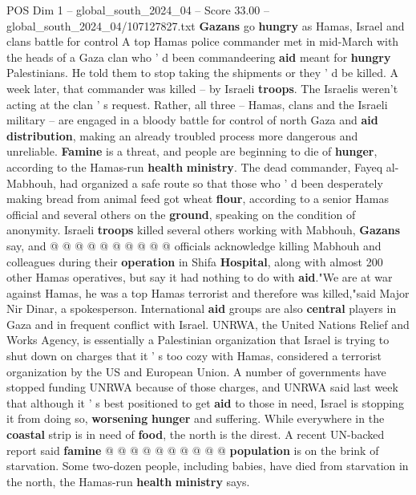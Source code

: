 \begin{textsample}{POS Dim 1 – global\_south\_2024\_04 – Score 33.00 – global\_south\_2024\_04/107127827.txt}  \label{ex:f1_pos_143}
\textbf{Gazans} go \textbf{hungry} as Hamas, Israel and clans battle for control A top Hamas police commander met in mid-March with the heads of a Gaza clan who ' d been commandeering \textbf{aid} meant for \textbf{hungry} Palestinians.
He told them to stop taking the shipments or they ' d be killed.
A week later, that commander was killed -- by Israeli \textbf{troops}.
The Israelis weren't acting at the clan ' s request.
Rather, all three -- Hamas, clans and the Israeli military -- are engaged in a bloody battle for control of north Gaza and \textbf{aid} \textbf{distribution}, making an already troubled process more dangerous and unreliable. \textbf{Famine} is a threat, and people are beginning to die of \textbf{hunger}, according to the Hamas-run \textbf{health} \textbf{ministry}.
The dead commander, Fayeq al-Mabhouh, had organized a safe route so that those who ' d been desperately making bread from animal feed got wheat \textbf{flour}, according to a senior Hamas official and several others on the \textbf{ground}, speaking on the condition of anonymity.
Israeli \textbf{troops} killed several others working with Mabhouh, \textbf{Gazans} say, and @ @ @ @ @ @ @ @ @ @ officials acknowledge killing Mabhouh and colleagues during their \textbf{operation} in Shifa \textbf{Hospital}, along with almost 200 other Hamas operatives, but say it had nothing to do with \textbf{aid}."We are at war against Hamas, he was a top Hamas terrorist and therefore was killed,"said Major Nir Dinar, a spokesperson.
International \textbf{aid} groups are also \textbf{central} players in Gaza and in frequent conflict with Israel.
UNRWA, the United Nations Relief and Works Agency, is essentially a Palestinian organization that Israel is trying to shut down on charges that it ' s too cozy with Hamas, considered a terrorist organization by the US and European Union.
A number of governments have stopped funding UNRWA because of those charges, and UNRWA said last week that although it ' s best positioned to get \textbf{aid} to those in need, Israel is stopping it from doing so, \textbf{worsening} \textbf{hunger} and suffering.
While everywhere in the \textbf{coastal} strip is in need of \textbf{food}, the north is the direst.
A recent UN-backed report said \textbf{famine} @ @ @ @ @ @ @ @ @ @ \textbf{population} is on the brink of starvation.
Some two-dozen people, including babies, have died from starvation in the north, the Hamas-run \textbf{health} \textbf{ministry} says.

\end{textsample}
